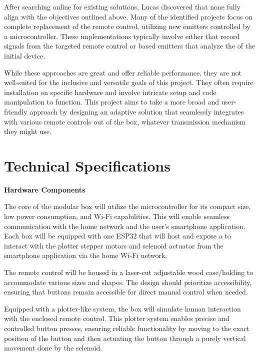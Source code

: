 After searching online for existing solutions, Lucas discovered that none fully align with the objectives outlined above.
Many of the identified projects focus on complete replacement of the remote control, utilizing new emitters controlled by a microcontroller.
These implementations typically involve either  that record signals from the targeted remote control or  based emitters that analyze the  of the initial device.

While these approaches are great and offer reliable performance, they are not well-suited for the inclusive and versatile goals of this project.
They often require installation on specific hardware and involve intricate setup and code manipulation to function.
This project aims to take a more broad and user-friendly approach by designing an adaptive solution that seamlessly integrates with various remote controls out of the box, whatever transmission mechanism they might use.

\section{Technical Specifications}

\textbf{Hardware Components}

The core of the modular box will utilize the  microcontroller for its compact size, low power consumption, and Wi-Fi capabilities.
This will enable seamless communication with the home network and the user's smartphone application.
Each box will be equipped with one ESP32 that will host and expose a  to interact with the plotter stepper motors and selenoid actuator from the smartphone application via the home Wi-Fi network.

The remote control will be housed in a laser-cut adjustable wood case/holding to accommodate various sizes and shapes.
The design should prioritize accessibility, ensuring that buttons remain accessible for direct manual control when needed.

Equipped with a plotter-like system, the box will simulate human interaction with the enclosed remote control.
This plotter system enables precise and controlled button presses, ensuring reliable functionality by moving to the exact position of the button and then actuating the button through a purely vertical movement done by the selenoid.

